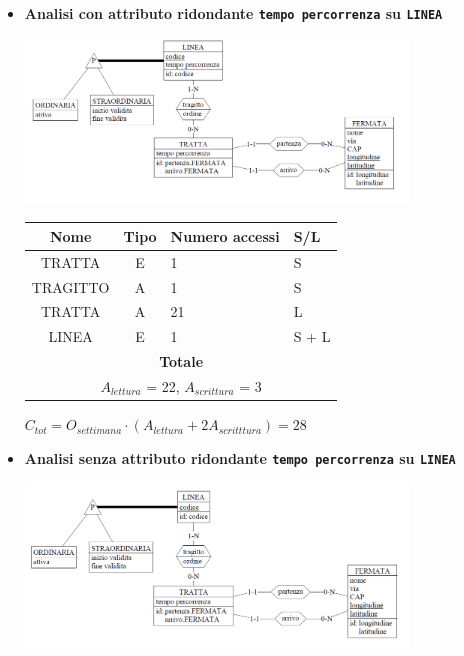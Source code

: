 \documentclass[12pt,a4paper]{report}
\begin{document}
\begin{enumerate}[label=\textbf{\arabic*)}]
    \begin{itemize}
    \item \textbf{Analisi con attributo ridondante \texttt{tempo percorrenza} su \texttt{LINEA}}
    \begin{center}
    \includegraphics[width=0.8\textwidth]{AggiornaLineaRid}
    \end{center}
    \begin{table}[H]
    \centering
    \begin{tabular}{|c|c|l|l|}
    \hline
    \textbf{Nome} & \textbf{Tipo} & \textbf{Numero accessi} & \textbf{S/L} \\
    \hline
    TRATTA & E & 1 & S \\
    \hline
    TRAGITTO & A & 1 & S \\
    \hline
    TRATTA & A & 21 & L \\
    \hline
    LINEA & E & 1 & S + L \\
    \hline
    \multicolumn{4}{c}{\textbf{Totale}} \\
    \multicolumn{4}{c}{${A_{lettura}}$ = 22, ${A_{scrittura}}$ = 3} \\
    \hline
    \end{tabular}
    \end{table}
    \begin{center}
    ${C_{tot} = {O_{settimana}}\cdot({A_{lettura}} + {2A_{scritttura}})= 28}$
    \end{center}
    \item \textbf{Analisi senza attributo ridondante \texttt{tempo percorrenza} su \texttt{LINEA}}
    \begin{center}
    \includegraphics[width=0.8\textwidth]{AggiornaLineaNoRid}

\end{center}
\end{itemize}
\end{enumerate}
\end{document}
